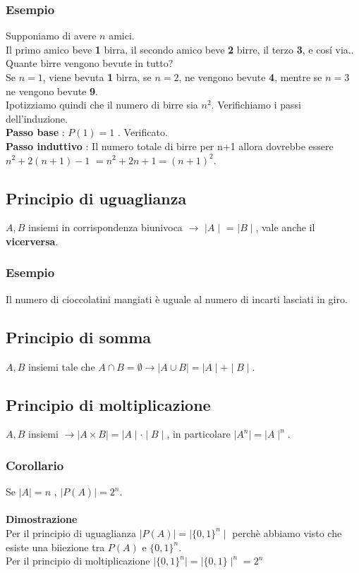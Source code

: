 \documentclass[11pt]{article}
\begin{document}
            \subsubsection{Esempio}
            Supponiamo di avere $n$ amici.\\
            Il primo amico beve \textbf{1} birra, il secondo amico beve \textbf{2} birre, il terzo \textbf{3}, e cos\'i via..\hspace{0,35cm}  Quante birre vengono bevute in tutto?\\
            Se $n = 1$, viene bevuta \textbf{1} birra, se $n=2$, ne vengono bevute \textbf{4}, mentre se $n=3$ ne vengono bevute \textbf{9}.\\
            Ipotizziamo quindi che il numero di birre sia $n^2$. Verifichiamo i passi dell'induzione.\\
            \textbf{Passo base} : $P(1)=1$ . Verificato.\\
            \textbf{Passo induttivo} : Il numero totale di birre per n+1 allora dovrebbe essere  $n^2 + 2(n+1) -1$ $= n^2 +2n +1 = (n+1)^2$.
            \subsection{Principio di uguaglianza}
            $A,B$ insiemi in corrispondenza biunivoca $\rightarrow$ $\mid A\mid$ = $\mid B \mid$, vale anche il \textbf{vicerversa}.
            \subsubsection{Esempio}
            Il numero di cioccolatini mangiati \`e uguale al numero di incarti lasciati in giro.
            \subsection{Principio di somma}
            $A,B$ insiemi tale che $A \cap B = \emptyset \rightarrow \mid A \cup B \mid = \mid A \mid + \mid B \mid $.
            \subsection{Principio di moltiplicazione}
            $A,B$ insiemi $\rightarrow \mid A \times B \mid = \mid A \mid \cdot \mid B \mid$, in particolare $\mid A^n \mid = \mid A \mid ^n$.
            \subsubsection{Corollario}
            Se $\mid A \mid = n$ , $\mid P(A)\mid=2^n$.\\
            \\
            \textbf{Dimostrazione}\\
            Per il principio di uguaglianza $\mid P(A) \mid = \mid \{0,1\}^n \mid$ perch\`e abbiamo visto che esiste una biiezione tra $P(A)$ e $\{0,1\}^n$.\\
            Per il principio di moltiplicazione $\mid\{0,1\}^n \mid=\mid \{0,1\}\mid^n= 2^n$
\end{document}
